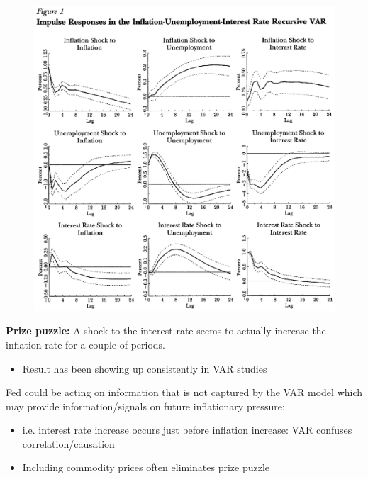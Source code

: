 \documentclass{beamer}
\begin{document}
\begin{frame}
\begin{figure}
  \end{figure}
\end{frame}

\begin{frame}
  \begin{figure}
    \includegraphics[scale=.5]{stock_watson2.eps}
  \end{figure}
\end{frame}

\begin{frame}
  \textbf{Prize puzzle:} A shock to the interest rate seems to actually increase the inflation rate for a couple of periods.
  \begin{itemize}
    \item Result has been showing up consistently in VAR studies
  \end{itemize}
  \medskip
  Fed could be acting on information that is not captured by the VAR model which may provide information/signals on future inflationary pressure:
  \begin{itemize}
    \item i.e. interest rate increase occurs just before inflation increase: VAR confuses correlation/causation
    \item Including commodity prices often eliminates prize puzzle
  \end{itemize}
\end{frame}
\end{document}
